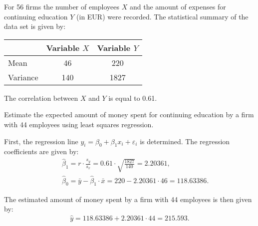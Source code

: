 
\begin{question}
For 56 firms the number of employees $X$ and the amount of
expenses for continuing education $Y$ (in EUR) were recorded. The
statistical summary of the data set is given by:

\begin{center}
\begin{tabular}{lcc} \hline
& Variable $X$ & Variable $Y$ \\ \hline
Mean & 46  & 220  \\
Variance & 140  & 1827 \\ \hline
\end{tabular}
\end{center}

The correlation between $X$ and $Y$ is equal to 0.61.

Estimate the expected amount of money spent for continuing education
by a firm with 44 employees using least squares regression.
\end{question}


\begin{solution}
First, the regression line $y_i = \beta_0 + \beta_1 x_i +
\varepsilon_i$ is determined.  The regression coefficients are given by:
\begin{eqnarray*}
&& \hat \beta_1 = r \cdot \frac{s_y}{s_x} = 
0.61 \cdot \sqrt{\frac{1827}{140}} = 2.20361, \\
&& \hat \beta_0 = \bar y - \hat \beta_1 \cdot \bar x = 
220 - 2.20361 \cdot 46 = 118.63386.
\end{eqnarray*}

The estimated amount of money spent by a firm with
44 employees is then given by:
\begin{eqnarray*}
\hat y = 118.63386 + 2.20361 \cdot 44 = 215.593.
\end{eqnarray*}
\end{solution}

